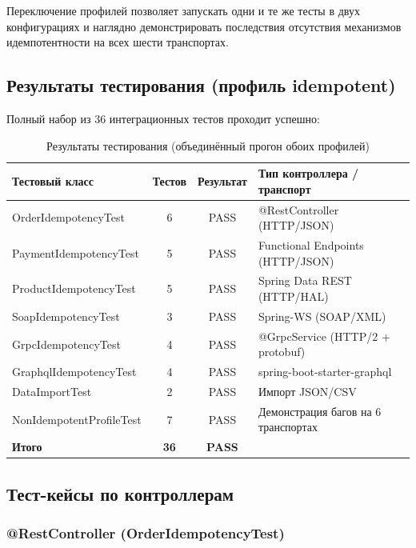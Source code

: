 Переключение профилей позволяет запускать одни и те же тесты в двух конфигурациях и наглядно демонстрировать последствия отсутствия механизмов идемпотентности на всех шести транспортах.

\subsection{Результаты тестирования (профиль idempotent)}

Полный набор из 36 интеграционных тестов проходит успешно:

\begin{table}[H]
\centering
\caption{Результаты тестирования (объединённый прогон обоих профилей)}
\label{tab:results-idempotent}
\small
\begin{tabular}{@{}lccl@{}}
\toprule
\textbf{Тестовый класс} & \textbf{Тестов} & \textbf{Результат} & \textbf{Тип контроллера / транспорт} \\
\midrule
OrderIdempotencyTest       & 6  & PASS & @RestController (HTTP/JSON) \\
PaymentIdempotencyTest     & 5  & PASS & Functional Endpoints (HTTP/JSON) \\
ProductIdempotencyTest     & 5  & PASS & Spring Data REST (HTTP/HAL) \\
SoapIdempotencyTest        & 3  & PASS & Spring-WS (SOAP/XML) \\
GrpcIdempotencyTest        & 4  & PASS & @GrpcService (HTTP/2 + protobuf) \\
GraphqlIdempotencyTest     & 4  & PASS & spring-boot-starter-graphql \\
DataImportTest             & 2  & PASS & Импорт JSON/CSV \\
NonIdempotentProfileTest   & 7  & PASS & Демонстрация багов на 6 транспортах \\
\midrule
\textbf{Итого}             & \textbf{36} & \textbf{PASS} & \\
\bottomrule
\end{tabular}
\end{table}

\subsection{Тест-кейсы по контроллерам}

\subsubsection{@RestController (OrderIdempotencyTest)}

